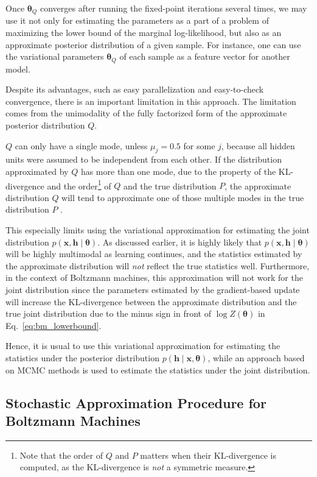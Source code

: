 \documentclass[dissertation,nocontribution]{aaltoseries}
\newcommand{\vect}[1]{\mathbf{#1}}
\newcommand{\vects}[1]{\boldsymbol{#1}}
\newcommand{\vh}[0]{\vect{h}}
\newcommand{\vx}[0]{\vect{x}}
\newcommand{\TT}[0]{{\vects{\theta}}}
\begin{document}
Once $\TT_Q$ converges after running the fixed-point
iterations several times, we may use it not only for
estimating the parameters as a part of a problem of
maximizing the lower bound of the marginal log-likelihood,
but also as an approximate posterior distribution of a given
sample. For instance, one can use the variational parameters
$\TT_Q$ of each sample as a feature vector for another
model.

Despite its advantages, such as easy parallelization and
easy-to-check convergence, there is an important limitation
in this approach. The limitation comes from the unimodality
of the fully factorized form of the approximate posterior
distribution $Q$.

$Q$ can only have a single mode, unless $\mu_j=0.5$ for some $j$,
because all hidden units were assumed to be independent from
each other. If the distribution approximated
by $Q$ has more than one mode, due to the property of the
KL-divergence and the order\footnote{Note that the order of
$Q$ and $P$ matters when their KL-divergence is computed, as
the KL-divergence is \textit{not} a symmetric measure.} of
$Q$ and the true distribution $P$, the approximate
distribution $Q$ will tend to approximate one of those
multiple modes in the true distribution $P$
\citep[see][Section 21.2.2 for more details]{Murphy2012}.

This especially limits using the variational approximation
for estimating the joint distribution ${p(\vx, \vh \mid
\TT)}$. As discussed earlier, it is highly likely that
${p(\vx, \vh \mid \TT)}$ will be highly multimodal as
learning continues, and the statistics estimated by the
approximate distribution will \textit{not} reflect the true
statistics well. Furthermore, in the context of Boltzmann
machines, this approximation will not work for the joint
distribution since the parameters estimated by the
gradient-based update will increase the KL-divergence
between the approximate distribution and the true joint
distribution due to the minus sign in front of $\log Z(\TT)$
in Eq.~\eqref{eq:bm_lowerbound}.

Hence, it is usual to use this variational approximation for
estimating the statistics under the posterior distribution
${p(\vh \mid \vx, \TT)}$, while an approach based on MCMC
methods is used to estimate the statistics under the joint
distribution. 

\subsection{Stochastic Approximation Procedure for Boltzmann Machines}
\label{sec:sap}
\end{document}
